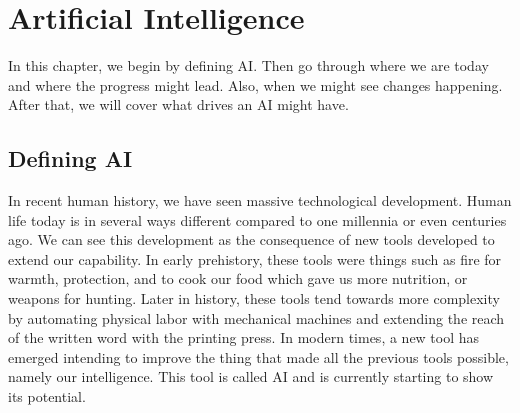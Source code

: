 \documentclass[12pt,A4]{report}
\newcommand{\autobaj}{}
\theoremstyle{definition}
\begin{document}


\chapter{Artificial Intelligence}
In this chapter, we begin by defining AI. Then go through where we are today and where the progress might lead. Also, when we might see changes happening. After that, we will cover what drives an AI might have.

\section{Defining AI}

In recent human history, we have seen massive technological development. Human life today is in several ways different compared to one millennia or even centuries ago. We can see this development as the consequence of new tools developed to extend our capability. In early prehistory, these tools were things such as fire for warmth, protection, and to cook our food which gave us more nutrition, or weapons for hunting. Later in history, these tools tend towards more complexity by automating physical labor with mechanical machines and extending the reach of the written word with the printing press. In modern times, a new tool has emerged intending to improve the thing that made all the previous tools possible, namely our intelligence. This tool is called AI and is currently starting to show its potential. 
\end{document}
